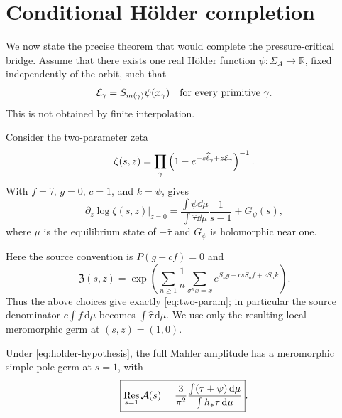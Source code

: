 \section{Conditional H\"older completion}

We now state the precise theorem that would complete the pressure-critical
bridge.  Assume that there exists one real H\"older function
\(\psi:\Sigma_A\to\mathbb R\), fixed independently of the orbit, such that
\begin{equation}
\mathcal E_\gamma=S_{m(\gamma)}\psi(x_\gamma)
\quad\text{for every primitive }\gamma.
\label{eq:holder-hypothesis}
\end{equation}
This is not obtained by finite interpolation.

Consider the two-parameter zeta
\begin{equation}
\zeta(s,z)=\prod_\gamma
\left(1-e^{-s\widehat\ell_\gamma+z\mathcal E_\gamma}\right)^{-1}.
\label{eq:two-param}
\end{equation}
With \(f=\widehat\tau\), \(g=0\), \(c=1\), and \(k=\psi\),
\citet[Theorem~6.4 and Corollary~6.4.1]{ParryPollicott1990} gives
\begin{equation}
\left.\partial_z\log\zeta(s,z)\right|_{z=0}
=\frac{\int\psi\dd\mu}{\int\widehat\tau\dd\mu}
\frac1{s-1}+G_\psi(s),
\label{eq:weighted-principal}
\end{equation}
where \(\mu\) is the equilibrium state of \(-\widehat\tau\) and
\(G_\psi\) is holomorphic near one.

Here the source convention is \(P(g-cf)=0\) and
\[
 \mathfrak Z(s,z)=
 \exp\!\left(
 \sum_{n\ge1}\frac1n\sum_{\sigma^nx=x}
 e^{S_ng-csS_nf+zS_nk}
 \right).
\]
Thus the above choices give exactly \eqref{eq:two-param}; in particular the
source denominator \(c\int f\,\mathrm d\mu\) becomes
\(\int\widehat\tau\,\mathrm d\mu\).  We use only the resulting local
meromorphic germ at \((s,z)=(1,0)\).

\begin{theorem}
Under \eqref{eq:holder-hypothesis}, the full Mahler amplitude has a
meromorphic simple-pole germ at \(s=1\), with
\begin{equation}
\boxed{
\operatorname*{Res}_{s=1}\mathcal A(s)
=\frac3{\pi^2}
\frac{\int(\tau+\psi)\,\mathrm d\mu}
{\int h_*\tau\,\mathrm d\mu}}.
\label{eq:full-residue}
\end{equation}
\end{theorem}

